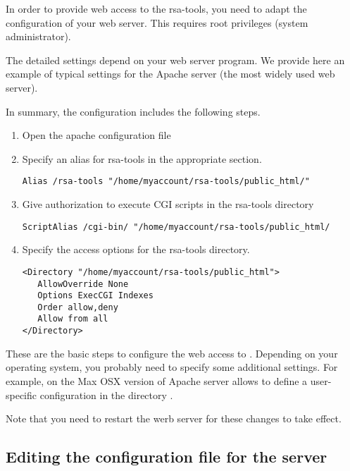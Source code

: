 \documentclass{article}
\begin{document}
In order to provide web access to the rsa-tools, you need to adapt the
configuration of your web server. This requires root privileges
(system administrator). 


The detailed settings depend on your web server program. We provide
here an example of typical settings for the Apache server (the most
widely used web server).

In summary, the configuration includes the following steps.

\begin{enumerate}
\item Open the apache configuration file 

\item Specify an alias for rsa-tools in the appropriate section.

\begin{verbatim}
Alias /rsa-tools "/home/myaccount/rsa-tools/public_html/"
\end{verbatim}

\item Give authorization to execute CGI scripts in the rsa-tools directory

\begin{verbatim}
ScriptAlias /cgi-bin/ "/home/myaccount/rsa-tools/public_html/
\end{verbatim}

\item Specify the access options for the rsa-tools directory.

\begin{verbatim}
<Directory "/home/myaccount/rsa-tools/public_html">
   AllowOverride None
   Options ExecCGI Indexes
   Order allow,deny
   Allow from all
</Directory>
\end{verbatim}

\end{enumerate}

These are the basic steps to configure the web access to
\RSAT. Depending on your operating system, you probably need to
specify some additional settings. For example, on the Max OSX version
of Apache server allows to define a user-specific configuration in the
directory .

Note that you need to restart the werb server for these changes to
take effect.

\subsection{Editing the configuration file for the server}
\end{document}
